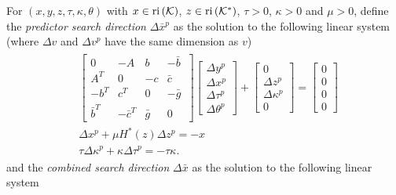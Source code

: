 \documentclass[10pt]{article}
\theoremstyle{definition}
\theoremstyle{plain}
\def\interior{\protect{\textnormal{ri}}}
\def\relint{\protect{\textnormal{ri}}}
\begin{document}
For $(x,y,z,\tau, \kappa,\theta)$ with $x \in \interior\left(\mathcal{K}\right)$, $z \in \relint\left(\mathcal{K}^*\right)$, $\tau > 0$, $\kappa > 0$ and $\mu>0$, define the \textit{predictor search direction} $\Delta{\bar{x}^p}$ as the solution to the following linear system (where $\Delta v$ and $\Delta v^p$ have the same dimension as $v$)
\begin{align}\label{predictor_system_mu}
\begin{split}
&  \begin{bmatrix}
0 & -A & b & -\bar b\ \\ 
A^T & 0 & -c & \bar c \\
-b^T & c^T& 0 & -\bar g \\
\bar b^T & -\bar c^T & \bar g & 0
\end{bmatrix}
\begin{bmatrix}
\Delta y^p \\ \Delta x^p \\ \Delta \tau^p \\ \Delta \theta^p
\end{bmatrix} + 
\begin{bmatrix}
0 \\ \Delta z^p \\ \Delta \kappa^p \\ 0 
\end{bmatrix} = 
\begin{bmatrix}
0 \\ 0 \\ 0 \\ 0
\end{bmatrix}\\
& \Delta x^p + \mu H^*\left(z\right) \Delta z^p = -x \\
& \tau \Delta{\kappa}^p + \kappa \Delta{\tau}^p = -\tau\kappa.
\end{split}
\end{align}
and the \textit{combined search direction} $\Delta \bar x$ as the solution to the following linear system
\end{document}
